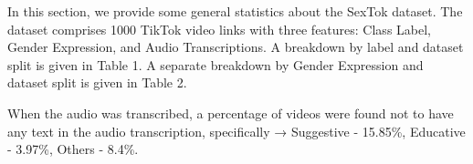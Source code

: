 \documentclass[11pt]{article}
\begin{document}
In this section, we provide some general statistics about the SexTok dataset. The dataset comprises 1000 TikTok video links with three features: Class Label, Gender Expression, and Audio Transcriptions. A breakdown by label and dataset split is given in Table 1. A separate breakdown by Gender Expression and dataset split is given in Table 2.

When the audio was transcribed, a percentage of videos were found not to have any text in the audio transcription, specifically → Suggestive - 15.85\%, Educative - 3.97\%, Others - 8.4\%. 

\begin{table}[ht]

\centering
\begin{small}
\end{small}
\caption{\label{table: Results-1} We present the average and standard deviation of results from three different runs of our experiments. We use accuracy, micro-precision, recall, and F1 (with "Others" as a negative class, not included in the scores) and macro-precision, recall, and F1 as metrics. Text-based classification, when transcript is present, has higher overall performance. }

\end{table}
\end{document}
